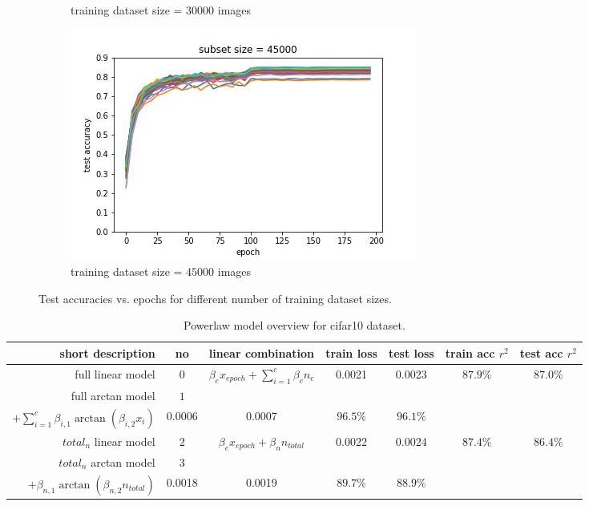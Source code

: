 \documentclass{article} %
\begin{document}
\begin{figure}
\begin{subfigure}{.5\textwidth}
        \caption{training dataset size = $30000$ images}
        \label{fig:subsetsize30000}
    \end{subfigure}%
    \begin{subfigure}{.5\textwidth}
        \centering
        \includegraphics[width=.8\linewidth]{cifar10/test_acc_vs_epoch_subset_size_45000.jpg}
        \caption{training dataset size = $45000$ images}
        \label{fig:subsetsize45000}
    \end{subfigure}

    \caption{Test accuracies vs. epochs for different number of training dataset sizes.}
    \label{fig:accuracy_vs_epoch_by_subset_size_cifar}
\end{figure}


\begin{table}[h!]
    \centering
    \begin{tabular}{|r|c|c|c|c|c|c|}
        \hline
        short description   & no  & linear combination                               & train loss & test loss & train acc $r^2$ & test acc $r^2$ \\
        \hline
        full linear model          & $0$ & $\beta_e x_{epoch} + \sum_{i = 1}^c \beta_c n_c$ & 0.0021    & 0.0023   & $87.9\%$        & $87.0\%$       \\
        \hline
        full arctan model & $1$& \makecell{$\beta_{e, 1} \arctan{(\beta_{e, 2} x_{epoch})}$ \\  $+ \sum_{i = 1}^c \beta_{i, 1} \arctan{(\beta_{i, 2} x_{i})}$}& 0.0006 & 0.0007 & $96.5\%$ & $96.1\%$ \\
        \hline
        $total_n$ linear model & $2$ & $\beta_e x_{epoch} + \beta_n n_{total}$          & 0.0022    & 0.0024   & $87.4\%$        & $86.4\%$       \\
        \hline
        $total_n$ arctan model &$3$&\makecell{ $\beta_{e, 1} \arctan{(\beta_{e, 2} x_{epoch})}$ \\ $+ \beta_{n, 1} \arctan{(\beta_{n, 2} n_{total})}$} & 0.0018 & 0.0019 & $89.7\%$ & $88.9\%$ \\
        \hline
    \end{tabular}
    \caption{Powerlaw model overview for cifar10 dataset.}
    \label{table:cifar_model_overview}
\end{table}
\end{document}

